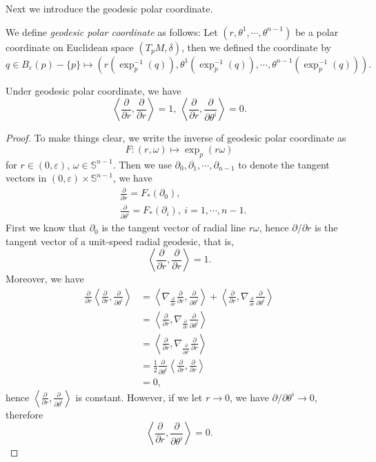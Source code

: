 Next we introduce the geodesic polar coordinate.
\begin{defn}
    We define \emph{geodesic polar coordinate} as follows:
    Let $(r,\theta^1,\cdots,\theta^{n-1})$ be a polar coordinate on Euclidean space $(T_pM,\delta)$, then we defined the coordinate by
    \[q\in B_\varepsilon(p)-\{p\}\mapsto(r(\exp_p^{-1}(q)),\theta^1(\exp_p^{-1}(q)),\cdots,\theta^{n-1}(\exp_p^{-1}(q))).\]
\end{defn}

\begin{prop}
    Under geodesic polar coordinate, we have
    \[\left\langle\frac{\partial}{\partial{r}},\frac{\partial}{\partial{r}}\right\rangle=1,\ \left\langle\frac{\partial}{\partial{r}},\frac{\partial}{\partial{\theta^i}}\right\rangle=0.\]
\end{prop}
\begin{proof}
    To make things clear, we write the inverse of geodesic polar coordinate as
    \[F:(r,\omega)\mapsto\exp_p(r\omega)\]
    for $r\in(0,\varepsilon)$, $\omega\in\mathbb{S}^{n-1}$.
    Then we use $\partial_0,\partial_1,\cdots,\partial_{n-1}$ to denote the tangent vectors in $(0,\varepsilon)\times\mathbb{S}^{n-1}$, we have
    \begin{align*}
        &\frac{\partial{}}{\partial{r}}=F_*(\partial_0),\\
        &\frac{\partial{}}{\partial{\theta^i}}=F_*(\partial_i),\ i=1,\cdots,n-1.
    \end{align*}
    First we know that $\partial_0$ is the tangent vector of radial line $r\omega$, hence $\partial/\partial{r}$ is the tangent vector of a unit-speed radial geodesic, that is,
    \[\left\langle\frac{\partial{}}{\partial{r}},\frac{\partial{}}{\partial{r}}\right\rangle=1.\]
    Moreover, we have
    \begin{align*}
        \frac{\partial}{\partial{r}}\left\langle\frac{\partial{}}{\partial{r}},\frac{\partial{}}{\partial{\theta^i}}\right\rangle&=\left\langle\nabla_{\frac{\partial{}}{\partial{r}}}\frac{\partial{}}{\partial{r}},\frac{\partial{}}{\partial{\theta^i}}\right\rangle+\left\langle\frac{\partial{}}{\partial{r}},\nabla_{\frac{\partial{}}{\partial{r}}}\frac{\partial{}}{\partial{\theta^i}}\right\rangle\\
        &=\left\langle\frac{\partial{}}{\partial{r}},\nabla_{\frac{\partial{}}{\partial{r}}}\frac{\partial{}}{\partial{\theta^i}}\right\rangle\\
        &=\left\langle\frac{\partial{}}{\partial{r}},\nabla_{\frac{\partial{}}{\partial{\theta^i}}}\frac{\partial{}}{\partial{r}}\right\rangle\\
        &=\frac{1}{2}\frac{\partial{}}{\partial{\theta^i}}\left\langle\frac{\partial{}}{\partial{r}},\frac{\partial{}}{\partial{r}}\right\rangle\\
        &=0,
    \end{align*}
    hence $\left\langle\frac{\partial{}}{\partial{r}},\frac{\partial{}}{\partial{\theta^i}}\right\rangle$ is constant.
    However, if we let $r\to 0$, we have $\partial/\partial{\theta^i}\to 0$, therefore
    \[\left\langle\frac{\partial{}}{\partial{r}},\frac{\partial{}}{\partial{\theta^i}}\right\rangle=0.\]
\end{proof}

